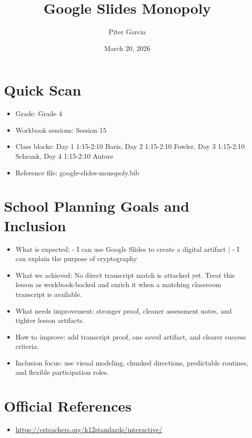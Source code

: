 \documentclass[11pt]{article}
\title{Google Slides Monopoly}
\author{Piter Garcia}
\date{March 20, 2026}
\begin{document}
\maketitle
\section*{Quick Scan}
\begin{itemize}[leftmargin=*]
\item Grade: Grade 4
\item Workbook sessions: Session 15
\item Class blocks: Day 1 1:15-2:10 Baris, Day 2 1:15-2:10 Fowler, Day 3 1:15-2:10 Schrank, Day 4 1:15-2:10 Autore
\item Reference file: google-slides-monopoly.bib
\end{itemize}
\section*{School Planning Goals and Inclusion}
\begin{itemize}[leftmargin=*]
\item What is expected: - I can use Google Slides to create a digital artifact | - I can explain the purpose of cryptography
\item What we achieved: No direct transcript match is attached yet. Treat this lesson as workbook-backed and enrich it when a matching classroom transcript is available.
\item What needs improvement: stronger proof, cleaner assessment notes, and tighter lesson artifacts.
\item How to improve: add transcript proof, one saved artifact, and clearer success criteria.
\item Inclusion focus: use visual modeling, chunked directions, predictable routines, and flexible participation roles.
\end{itemize}
\section*{Official References}
\begin{itemize}[leftmargin=*]
\item \url{https://csteachers.org/k12standards/interactive/}

\end{itemize}
\end{document}

